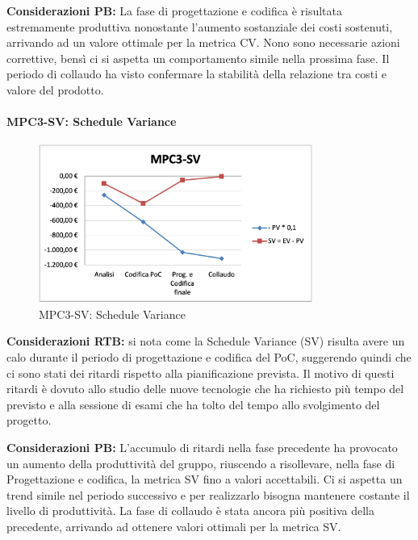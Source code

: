 \vspace{0.5cm}
\noindent \textbf{Considerazioni PB:} La fase di progettazione e codifica è risultata estremamente produttiva nonostante l'aumento sostanziale dei costi sostenuti, arrivando ad un valore ottimale per la metrica CV. Nono sono necessarie azioni correttive, bensì ci si aspetta un comportamento simile nella prossima fase. Il periodo di collaudo ha visto confermare la stabilità della relazione tra costi e valore del prodotto. 


\paragraph{MPC3-SV: Schedule Variance}
\begin{figure}[h!]
    \centering
    \includegraphics[width=0.8\textwidth]{images/MPC3-SV.png}
    \caption{MPC3-SV: Schedule Variance}
\end{figure}
\noindent \textbf{Considerazioni RTB:} si nota come la Schedule Variance (SV) risulta avere un calo durante il periodo di progettazione e codifica del PoC, suggerendo quindi che ci sono stati dei ritardi rispetto alla pianificazione prevista. Il motivo di questi ritardi è dovuto allo studio delle nuove tecnologie che ha richiesto più tempo del previsto e alla sessione di esami che ha tolto del tempo allo svolgimento del progetto.

\vspace{0.5cm}
\noindent \textbf{Considerazioni PB:} L'accumulo di ritardi nella fase precedente ha provocato un aumento della produttività del gruppo, riuscendo a risollevare, nella fase di Progettazione e codifica, la metrica SV fino a valori accettabili. Ci si aspetta un trend simile nel periodo successivo e per realizzarlo bisogna mantenere costante il livello di produttività. La fase di collaudo è stata ancora più positiva della precedente, arrivando ad ottenere valori ottimali per la metrica SV.

